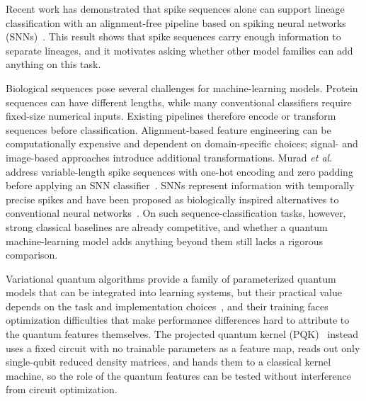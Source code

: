 \documentclass[conference]{IEEEtran}
\begin{document}
Recent work has demonstrated that spike sequences alone can support lineage classification with an alignment-free pipeline based on spiking neural networks (SNNs)~\cite{murad2024snn}. This result shows that spike sequences carry enough information to separate lineages, and it motivates asking whether other model families can add anything on this task.

Biological sequences pose several challenges for machine-learning models. Protein sequences can have different lengths, while many conventional classifiers require fixed-size numerical inputs. Existing pipelines therefore encode or transform sequences before classification. Alignment-based feature engineering can be computationally expensive and dependent on domain-specific choices; signal- and image-based approaches introduce additional transformations. Murad \textit{et al.} address variable-length spike sequences with one-hot encoding and zero padding before applying an SNN classifier~\cite{murad2024snn}. SNNs represent information with temporally precise spikes and have been proposed as biologically inspired alternatives to conventional neural networks~\cite{maass1997,pfeiffer2018}. On such sequence-classification tasks, however, strong classical baselines are already competitive, and whether a quantum machine-learning model adds anything beyond them still lacks a rigorous comparison.

Variational quantum algorithms provide a family of parameterized quantum models that can be integrated into learning systems, but their practical value depends on the task and implementation choices~\cite{cerezo2021vqa}, and their training faces optimization difficulties that make performance differences hard to attribute to the quantum features themselves. The projected quantum kernel (PQK)~\cite{huang2021power} instead uses a fixed circuit with no trainable parameters as a feature map, reads out only single-qubit reduced density matrices, and hands them to a classical kernel machine, so the role of the quantum features can be tested without interference from circuit optimization.
\end{document}
